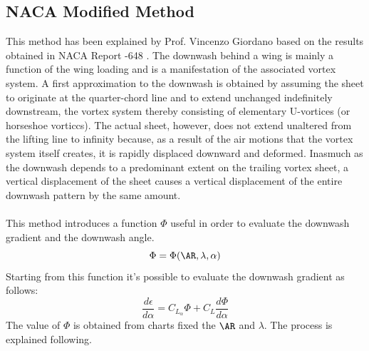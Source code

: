 \subsection {NACA Modified Method }
This method has been explained by Prof. Vincenzo Giordano\cite{uninagiordano}  based on the results obtained in NACA Report -648 \cite{Jacobs:NACA:Rep:648}.
The downwash behind a wing is mainly a function of the wing loading and is a manifestation of the associated vortex system. A first approximation to the downwash is obtained by assuming the sheet to originate at the quarter-chord line and to extend unchanged indefinitely downstream, the vortex system thereby consisting of elementary U-vortices (or horseshoe vorticcs). The actual sheet, however, does not extend unaltered from the lifting line to infinity because, as a result of the air motions that the vortex system itself creates, it is rapidly displaced downward and deformed. Inasmuch as the downwash depends to a predominant extent on the trailing vortex sheet, a vertical displacement of the sheet causes a vertical displacement of the entire downwash pattern by the same amount. \\ \\
This method introduces a function $\Phi$ useful in order to evaluate the downwash gradient and the downwash angle.
\begin{equation}
\Phi = \Phi ( \AR , \lambda, \alpha)
\end{equation}
Starting from this function it's possible to evaluate the downwash gradient as follows:
\begin{equation}
\frac{d\epsilon}{d \alpha } = C_{L_{\alpha}} \Phi + C_L \frac{d\Phi}{d \alpha }
\end{equation}
The value of $\Phi$ is obtained from charts fixed the $\AR$ and $\lambda$. The process is explained following.
\noindent \\

